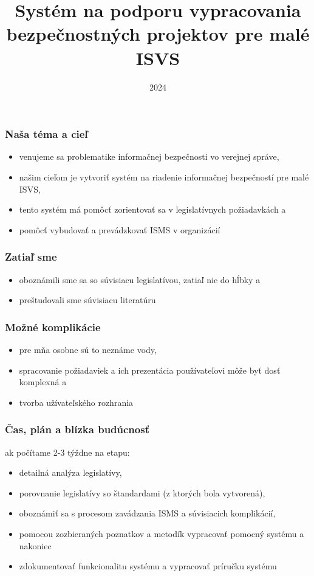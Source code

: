 \documentclass{beamer}
\title{Systém na podporu vypracovania bezpečnostných projektov pre malé ISVS}
\author{
    {Anton Kica} \\
    {\and} \\
    {\textit{Školiteľ}} \\
    {RNDr. Daniel Olejár, PhD.}
}
\institute{FMFI Matfyz}
\date{2024}
\begin{document}
\frame{\titlepage}

\begin{frame}
    \frametitle{Naša téma a cieľ}
    \begin{itemize}
      \item venujeme sa problematike informačnej bezpečnosti vo verejnej správe,
      \item našim cieľom je vytvoriť systém na riadenie informačnej bezpečností pre malé ISVS,
      \item tento systém má pomôcť zorientovať sa v legislatívnych požiadavkách a
      \item pomôcť vybudovať a prevádzkovať ISMS v organizácií
    \end{itemize}
\end{frame}

\begin{frame}
    \frametitle{Zatiaľ sme}
    \begin{itemize}
      \item oboznámili sme sa so súvisiacu legislatívou, zatiaľ nie do hĺbky a
      \item preštudovali sme súvisiacu literatúru
    \end{itemize}
\end{frame}
\begin{frame}
    \frametitle{Možné komplikácie}
    \begin{itemize}
      \item pre mňa osobne sú to neznáme vody,
      \item spracovanie požiadaviek a ich prezentácia používateľovi môže byť dosť komplexná a
      \item tvorba užívateľského rozhrania
    \end{itemize}
\end{frame}
\begin{frame}
    \frametitle{Čas, plán a blízka budúcnosť}
    ak počítame 2-3 týždne na etapu:
    \begin{itemize}
      \item detailná analýza legislatívy,
      \item porovnanie legislatívy so štandardami (z ktorých bola vytvorená),
      \item oboznámiť sa s procesom zavádzania ISMS a súvisiacich komplikácií,
      \item pomocou zozbieraných poznatkov a metodík vypracovať pomocný systému a nakoniec
      \item zdokumentovať funkcionalitu systému a vypracovať príručku systému
    \end{itemize}
\end{frame}
\end{document}
